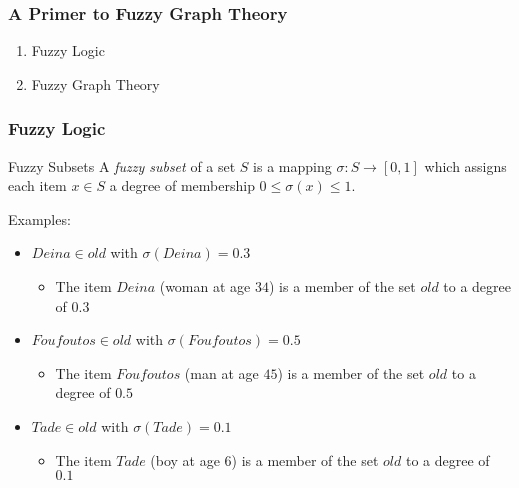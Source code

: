 



\begin{frame}
	\frametitle{A Primer to Fuzzy Graph Theory}

	\begin{enumerate}
		\item Fuzzy Logic
		\item Fuzzy Graph Theory
	\end{enumerate}
\end{frame}

\begin{frame}
	\frametitle{Fuzzy Logic}

	\begin{block}{Fuzzy Subsets}
		A \textit{fuzzy subset} of a set $S$ is a mapping $\sigma: S \rightarrow [0, 1]$ which assigns each item $x \in S$ a degree of membership $0 \le \sigma(x) \le 1$.

		\vspace*{2em}

		Examples:
		\begin{itemize}
			\item $Deina \in old$ with $\sigma(Deina) = 0.3$
			\begin{itemize}
				\item The item $Deina$ (woman at age $34$) is a member of the set $old$ to a degree of $0.3$
			\end{itemize}
			\item $Foufoutos \in old$ with $\sigma(Foufoutos) = 0.5$
			\begin{itemize}
				\item The item $Foufoutos$ (man at age $45$) is a member of the set $old$ to a degree of $0.5$
			\end{itemize}
			\item $Tade \in old$ with $\sigma(Tade) = 0.1$
			\begin{itemize}
				\item The item $Tade$ (boy at age $6$) is a member of the set $old$ to a degree of $0.1$
			\end{itemize}
		\end{itemize}
	\end{block}
\end{frame}


